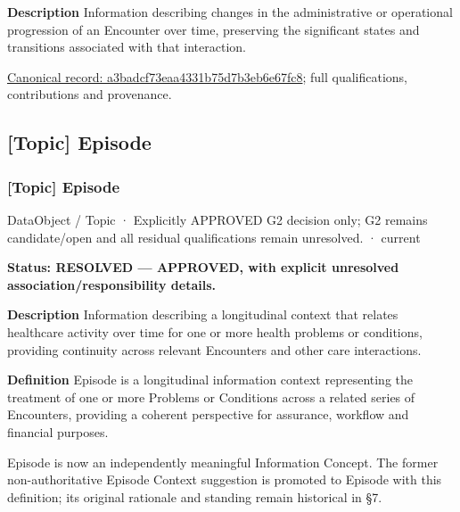 \textbf{Description}
Information describing changes in the administrative or operational progression of an Encounter over time, preserving the significant states and transitions associated with that interaction.


{\footnotesize \href{../../../../continuum/application/data-object/topic/a3badcf73eaa4331b75d7b3eb6e67fc8.md}{Canonical record: a3badcf73eaa4331b75d7b3eb6e67fc8}; full qualifications, contributions and provenance.}\par
\subsection{[Topic] Episode}

\subsubsection{[Topic] Episode}

\label{element:3927d161556d48f4b2cc57bd46ab785d}
{\small DataObject / Topic · Explicitly APPROVED G2 decision only; G2 remains candidate/open and all residual qualifications remain unresolved. · current}\par

\textbf{Status: RESOLVED — APPROVED, with explicit unresolved association/responsibility details.}



\textbf{Description}
Information describing a longitudinal context that relates healthcare activity over time for one or more health problems or conditions, providing continuity across relevant Encounters and other care interactions.



\textbf{Definition}
Episode is a longitudinal information context representing the treatment of one or more Problems or Conditions across a related series of Encounters, providing a coherent perspective for assurance, workflow and financial purposes.



Episode is now an independently meaningful Information Concept. The former non-authoritative Episode Context suggestion is promoted to Episode with this definition; its original rationale and standing remain historical in §7.



